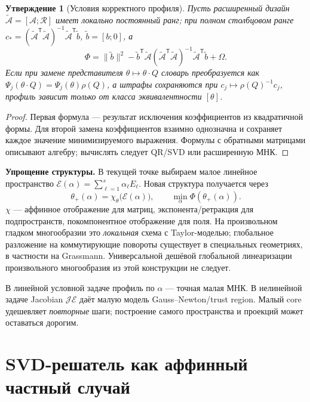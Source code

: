 \documentclass[11pt,a4paper]{article}
\newcommand{\T}{^{\mathsf T}}
\newtheorem{proposition}{Утверждение}[section]
\begin{document}
\begin{proposition}[Условия корректного профиля]\label{prop:profile}
Пусть расширенный дизайн $\widetilde{\mathcal A}=[\mathcal A;\mathcal R]$
имеет локально постоянный ранг; при полном столбцовом ранге
$c_*=(\widetilde{\mathcal A}\T\widetilde{\mathcal A})^{-1}
\widetilde{\mathcal A}\T\tilde b$, $\tilde b=[b;0]$, а
\[
 \Phi=\|\tilde b\|^2-
 \tilde b\T\widetilde{\mathcal A}
 (\widetilde{\mathcal A}\T\widetilde{\mathcal A})^{-1}
 \widetilde{\mathcal A}\T\tilde b+\Omega.
\]
Если при замене представителя $\theta\mapsto\theta\cdot Q$ словарь
преобразуется как $\Psi_j(\theta\cdot Q)=\Psi_j(\theta)\rho(Q)$,
а штрафы сохраняются при $c_j\mapsto\rho(Q)^{-1}c_j$, профиль зависит
только от класса эквивалентности $[\theta]$.
\end{proposition}
\begin{proof}
Первая формула --- результат исключения коэффициентов из квадратичной
формы. Для второй замена коэффициентов взаимно однозначна и сохраняет
каждое значение минимизируемого выражения. Формулы с обратными матрицами
описывают алгебру; вычислять следует QR/SVD или расширенную МНК.
\end{proof}

\textbf{Упрощение структуры.} В текущей точке выбираем малое линейное
пространство $\mathcal E(\alpha)=\sum_{\ell=1}^s\alpha_\ell E_\ell$.
Новая структура получается через
\begin{equation}\label{eq:chart}
 \theta_+(\alpha)=\chi_\theta\bigl(\mathcal E(\alpha)\bigr),
 \qquad\min_\alpha\Phi(\theta_+(\alpha)).
\end{equation}
$\chi$ --- аффинное отображение для матриц, экспонента/ретракция для
подпространств, покомпонентное отображение для поля. На произвольном
гладком многообразии это \emph{локальная} схема с Taylor-моделью;
глобальное разложение на коммутирующие повороты существует в специальных
геометриях, в частности на Grassmann. Универсальной дешёвой глобальной
линеаризации произвольного многообразия из этой конструкции не следует.

В линейной условной задаче профиль по $\alpha$ --- точная малая МНК.
В нелинейной задаче Jacobian $\mathcal J\mathcal E$ даёт малую модель
Gauss--Newton/trust region. Малый core удешевляет \emph{повторные} шаги;
построение самого пространства и проекций может оставаться дорогим.

\section{SVD-решатель как аффинный частный случай}\label{sec:svd}
\end{document}
